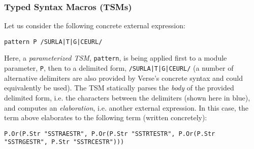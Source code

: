 \subsubsection{Typed Syntax Macros (TSMs)}\label{sec:tsms}
Let us consider the following concrete external expression:
\begin{lstlisting}[numbers=none]
pattern P /SURLA|T|G|CEURL/
\end{lstlisting}
Here, a \emph{parameterized TSM}, \lstinline{pattern}, is being applied first to a module parameter, \lstinline{P}, then to a {delimited form}, \lstinline{/SURLA|T|G|CEURL/} (a number of alternative delimiters are also provided by Verse's concrete syntax and could equivalently be used). The TSM statically parses the \emph{body} of the provided delimited form, i.e. the characters between the delimiters (shown here in blue), and computes an \emph{elaboration}, i.e. another external expression. In this case, the term above elaborates to the following term (written concretely):

\begin{lstlisting}[numbers=none]
P.Or(P.Str "SSTRAESTR", P.Or(P.Str "SSTRTESTR", P.Or(P.Str "SSTRGESTR", P.Str "SSTRCESTR")))
\end{lstlisting}

